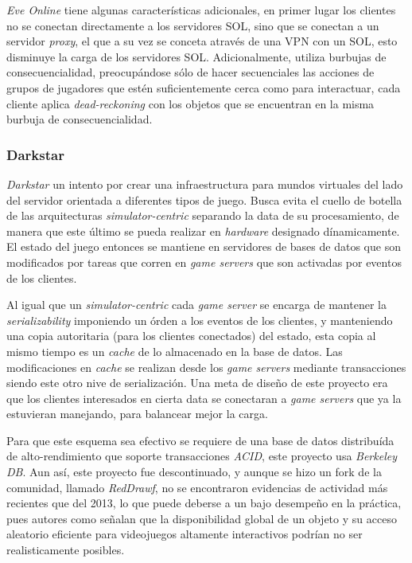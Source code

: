 \emph{Eve Online} tiene algunas características adicionales, en primer lugar los clientes no se conectan directamente a los servidores SOL, sino que se conectan a un servidor \emph{proxy}, el que a su vez se conceta através de una VPN con un SOL, esto disminuye la carga de los servidores SOL. Adicionalmente, utiliza burbujas de consecuencialidad, preocupándose sólo de hacer secuenciales las acciones de grupos de jugadores que estén suficientemente cerca como para interactuar, cada cliente aplica \emph{dead-reckoning} con los objetos que se encuentran en la misma burbuja de consecuencialidad.

\subsubsection{Darkstar}

\emph{Darkstar} un intento por crear una infraestructura para mundos virtuales del lado del servidor orientada a diferentes tipos de juego. Busca evita el cuello de botella de las arquitecturas \emph{simulator-centric} separando la data de su procesamiento, de manera que este último se pueda realizar en \emph{hardware} designado dínamicamente. El estado del juego entonces se mantiene en servidores de bases de datos que son modificados por tareas que corren en \emph{game servers} que son activadas por eventos de los clientes.

Al igual que un \emph{simulator-centric} cada \emph{game server} se encarga de mantener la \emph{serializability} imponiendo un órden a los eventos de los clientes, y manteniendo una copia autoritaria (para los clientes conectados) del estado, esta copia al mismo tiempo es un \emph{cache} de lo almacenado en la base de datos. Las modificaciones en \emph{cache} se realizan desde los \emph{game servers} mediante transacciones siendo este otro nive de serialización. Una meta de diseño de este proyecto era que los clientes interesados en cierta data se conectaran a \emph{game servers} que ya la estuvieran manejando, para balancear mejor la carga.

Para que este esquema sea efectivo se requiere de una base de datos distribuída de alto-rendimiento que soporte transacciones \emph{ACID}, este proyecto usa \emph{Berkeley DB}. Aun así, este proyecto fue descontinuado, y aunque se hizo un fork de la comunidad, llamado \emph{RedDrawf}, no se encontraron evidencias de actividad más recientes que del 2013, lo que puede deberse a un bajo desempeño en la práctica, pues autores como \cite{fujita2006new} señalan que la disponibilidad global de un objeto y su acceso aleatorio eficiente para videojuegos altamente interactivos podrían no ser realisticamente posibles.

